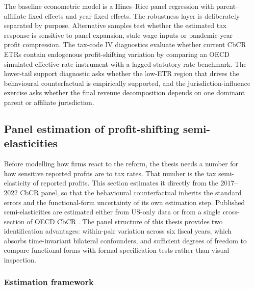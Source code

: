 \documentclass[11pt,a4paper]{article}
\begin{document}
The baseline econometric model is a Hines--Rice panel regression with parent--affiliate fixed effects and year fixed effects. The robustness layer is deliberately separated by purpose. Alternative samples test whether the estimated tax response is sensitive to panel expansion, stale wage inputs or pandemic-year profit compression. The tax-code IV diagnostics evaluate whether current CbCR ETRs contain endogenous profit-shifting variation by comparing an OECD simulated effective-rate instrument with a lagged statutory-rate benchmark. The lower-tail support diagnostic asks whether the low-ETR region that drives the behavioural counterfactual is empirically supported, and the jurisdiction-influence exercise asks whether the final revenue decomposition depends on one dominant parent or affiliate jurisdiction.

\subsection{Panel estimation of profit-shifting semi-elasticities}\label{sec:estimation}

Before modelling how firms react to the reform, the thesis needs a number for how sensitive reported profits are to tax rates. That number is the tax semi-elasticity of reported profits. This section estimates it directly from the 2017--2022 CbCR panel, so that the behavioural counterfactual inherits the standard errors and the functional-form uncertainty of its own estimation step. Published semi-elasticities are estimated either from US-only data \citep{dowd2017} or from a single cross-section of OECD CbCR \citep{garcia-bernardo2024}. The panel structure of this thesis provides two identification advantages: within-pair variation across six fiscal years, which absorbs time-invariant bilateral confounders, and sufficient degrees of freedom to compare functional forms with formal specification tests rather than visual inspection.

\subsubsection{Estimation framework}\label{sec:hines_rice}
\end{document}
